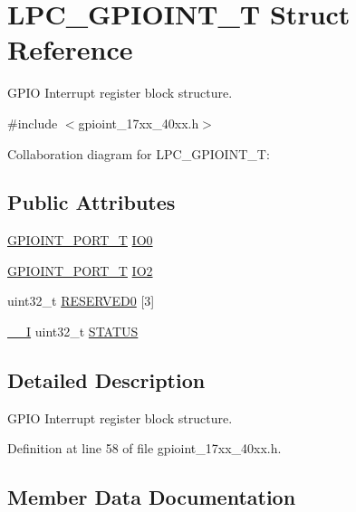 \hypertarget{structLPC__GPIOINT__T}{}\section{L\+P\+C\+\_\+\+G\+P\+I\+O\+I\+N\+T\+\_\+T Struct Reference}
\label{structLPC__GPIOINT__T}


G\+P\+IO Interrupt register block structure.  




{\ttfamily \#include $<$gpioint\+\_\+17xx\+\_\+40xx.\+h$>$}



Collaboration diagram for L\+P\+C\+\_\+\+G\+P\+I\+O\+I\+N\+T\+\_\+T\+:
\subsection*{Public Attributes}
\begin{DoxyCompactItemize}
\item 
\hyperlink{structGPIOINT__PORT__T}{G\+P\+I\+O\+I\+N\+T\+\_\+\+P\+O\+R\+T\+\_\+T} \hyperlink{structLPC__GPIOINT__T_a4edac525fb01aae7b57c4bcc9563ae27}{I\+O0}
\item 
\hyperlink{structGPIOINT__PORT__T}{G\+P\+I\+O\+I\+N\+T\+\_\+\+P\+O\+R\+T\+\_\+T} \hyperlink{structLPC__GPIOINT__T_a1300843bc75ee56c6177f05f69b23ef8}{I\+O2}
\item 
uint32\+\_\+t \hyperlink{structLPC__GPIOINT__T_a6afff78f3399fec13a72b78999cc6b80}{R\+E\+S\+E\+R\+V\+E\+D0} \mbox{[}3\mbox{]}
\item 
\hyperlink{core__cm3_8h_af63697ed9952cc71e1225efe205f6cd3}{\+\_\+\+\_\+I} uint32\+\_\+t \hyperlink{structLPC__GPIOINT__T_a9547c1d447b762a819920fe2a10c5029}{S\+T\+A\+T\+US}
\end{DoxyCompactItemize}


\subsection{Detailed Description}
G\+P\+IO Interrupt register block structure. 

Definition at line 58 of file gpioint\+\_\+17xx\+\_\+40xx.\+h.



\subsection{Member Data Documentation}
